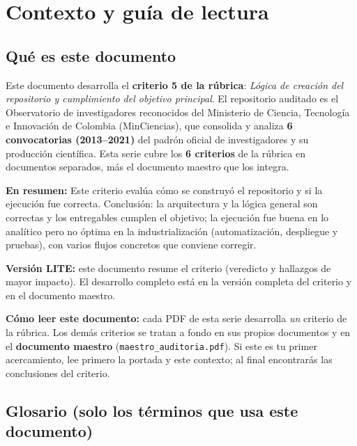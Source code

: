 \section{Contexto y guía de lectura}

\subsection{Qué es este documento}

Este documento desarrolla el \textbf{criterio 5 de la rúbrica}:
\emph{Lógica de creación del repositorio y cumplimiento del objetivo principal}. El repositorio auditado es el
Observatorio de investigadores reconocidos del Ministerio de Ciencia,
Tecnología e Innovación de Colombia (MinCiencias), que consolida y analiza
\textbf{6 convocatorias (2013--2021)} del padrón oficial de investigadores
y su producción científica. Esta serie cubre los \textbf{6 criterios} de la
rúbrica en documentos separados, más el documento maestro que los integra.

\textbf{En resumen:} Este criterio evalúa cómo se construyó el repositorio y si la ejecución fue correcta. Conclusión: la arquitectura y la lógica general son correctas y los entregables cumplen el objetivo; la ejecución fue buena en lo analítico pero no óptima en la industrialización (automatización, despliegue y pruebas), con varios flujos concretos que conviene corregir.


\begin{tcolorbox}[nota]\textbf{Versión LITE:} este documento resume el criterio (veredicto y hallazgos de mayor impacto). El desarrollo completo está en la versión completa del criterio y en el documento maestro.\end{tcolorbox}

\begin{tcolorbox}[nota]
\textbf{Cómo leer este documento:} cada PDF de esta serie desarrolla \emph{un}
criterio de la rúbrica. Los demás criterios se tratan a fondo en sus propios
documentos y en el \textbf{documento maestro} (\texttt{maestro\_auditoria.pdf}).
Si este es tu primer acercamiento, lee primero la portada y este contexto; al
final encontrarás las conclusiones del criterio.
\end{tcolorbox}

\subsection{Glosario (solo los términos que usa este documento)}


